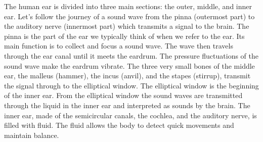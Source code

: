       \label{m38800*id184052}The human ear is divided into three main sections: the outer, middle,
and inner ear. Let's follow the journey of a sound wave from the pinna (outermost part) to the auditory nerve (innermost part) which transmits a signal to the brain. The pinna is the part of the ear we typically think of when we refer to the ear. Its main
function is to collect and focus a sound wave. The wave
then travels through the ear canal until it meets the eardrum. The
pressure fluctuations of the sound wave make the eardrum vibrate.
The three very small bones of the middle ear, the malleus (hammer),
the incus (anvil), and the stapes (stirrup), transmit the signal through
to the elliptical window. The elliptical window is the beginning of the
inner ear. From the elliptical window the sound waves are transmitted through the liquid
in the inner ear and interpreted as sounds by the brain.
The inner ear, made of the semicircular canals, the cochlea,
and the auditory nerve, is filled with fluid. The fluid allows the body to
detect quick movements and maintain balance. 


